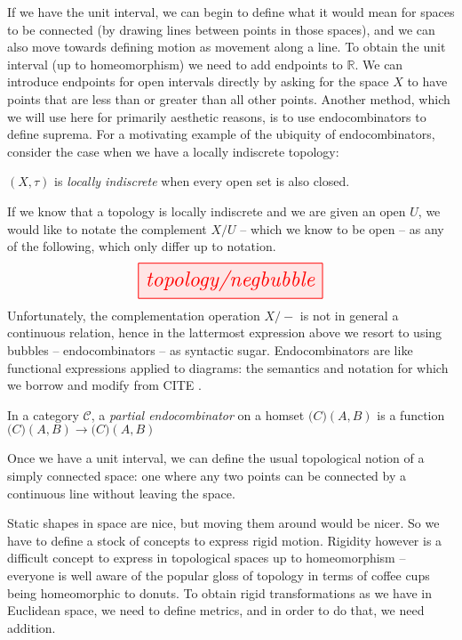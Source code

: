 If we have the unit interval, we can begin to define what it would mean for spaces to be connected (by drawing lines between points in those spaces), and we can also move towards defining motion as movement along a line. To obtain the unit interval (up to homeomorphism) we need to add endpoints to $\mathbb{R}$. We can introduce endpoints for open intervals directly by asking for the space $X$ to have points that are less than or greater than all other points. Another method, which we will use here for primarily aesthetic reasons, is to use endocombinators to define suprema. For a motivating example of the ubiquity of endocombinators, consider the case when we have a locally indiscrete topology:
\begin{defn}
$(X,\tau)$ is \emph{locally indiscrete} when every open set is also closed.
\end{defn}
If we know that a topology is locally indiscrete and we are given an open $U$, we would like to notate the complement $X/U$ -- which we know to be open -- as any of the following, which only differ up to notation.
\[\resizebox{0.5\textwidth}{!}{\tikzfig{topology/negbubble}}\]
Unfortunately, the complementation operation $X/-$ is not in general a continuous relation, hence in the lattermost expression above we resort to using bubbles -- endocombinators -- as syntactic sugar. Endocombinators are like functional expressions applied to diagrams: the semantics and notation for which we borrow and modify from \bR CITE \e.
\begin{defn}
In a category $\mathcal{C}$, a \emph{partial endocombinator} on a homset $\mathcal(C)(A,B)$ is a function $\mathcal(C)(A,B) \rightarrow \mathcal(C)(A,B)$
\end{defn}


Once we have a unit interval, we can define the usual topological notion of a simply connected space: one where any two points can be connected by a continuous line without leaving the space.


Static shapes in space are nice, but moving them around would be nicer. So we have to define a stock of concepts to express rigid motion. Rigidity however is a difficult concept to express in topological spaces up to homeomorphism -- everyone is well aware of the popular gloss of topology in terms of coffee cups being homeomorphic to donuts. To obtain rigid transformations as we have in Euclidean space, we need to define metrics, and in order to do that, we need addition.

